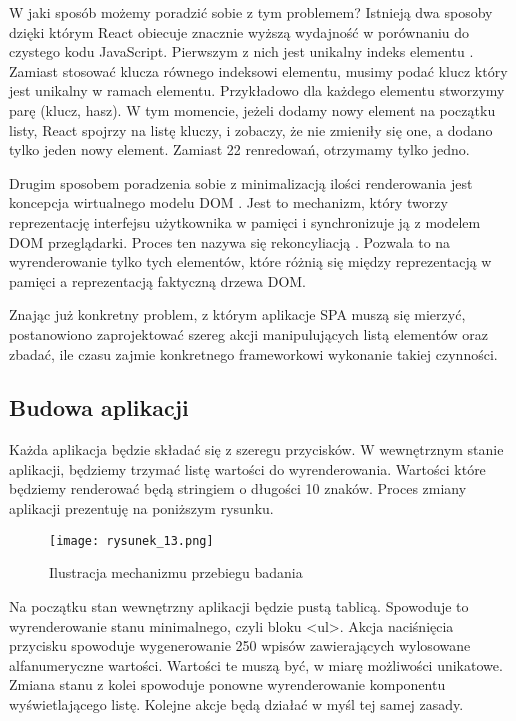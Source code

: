 W jaki sposób możemy poradzić sobie z tym problemem? Istnieją dwa sposoby dzięki którym React obiecuje znacznie wyższą wydajność w porównaniu do czystego kodu JavaScript.
Pierwszym z nich jest unikalny indeks elementu \cite{react-lists}. Zamiast stosować klucza równego indeksowi elementu, musimy podać klucz który jest unikalny w ramach elementu.
Przykładowo dla każdego elementu stworzymy parę (klucz, hasz). W tym momencie, jeżeli dodamy nowy element na początku listy, React spojrzy na listę kluczy, i zobaczy, że nie zmieniły się one, a dodano tylko jeden nowy element.
Zamiast 22 renredowań, otrzymamy tylko jedno.

Drugim sposobem poradzenia sobie z minimalizacją ilości renderowania jest koncepcja wirtualnego modelu DOM \cite{virtualdom}.
Jest to mechanizm, który tworzy reprezentację interfejsu użytkownika w pamięci i synchronizuje ją z modelem DOM przeglądarki. Proces ten nazywa się rekoncyliacją \cite{reconcilation}.
Pozwala to na wyrenderowanie tylko tych elementów, które różnią się między reprezentacją w pamięci a reprezentacją faktyczną drzewa DOM.

Znając już konkretny problem, z którym aplikacje SPA muszą się mierzyć, postanowiono zaprojektować szereg akcji manipulujących listą elementów oraz zbadać, ile czasu zajmie konkretnego frameworkowi wykonanie takiej czynności.

\subsection{Budowa aplikacji}

Każda aplikacja będzie składać się z szeregu przycisków. W wewnętrznym stanie aplikacji, będziemy trzymać listę wartości do wyrenderowania. Wartości które będziemy renderować będą stringiem o długości 10 znaków. Proces zmiany aplikacji prezentuję na poniższym rysunku.
\begin{figure}[htbp]
    \centering
    \texttt{[image: rysunek\_13.png]}
    \caption{Ilustracja mechanizmu przebiegu badania}
    \label{fig:rysunek_13}
\end{figure}

Na początku stan wewnętrzny aplikacji będzie pustą tablicą. Spowoduje to wyrenderowanie stanu minimalnego, czyli bloku <ul>.
Akcja naciśnięcia przycisku spowoduje wygenerowanie 250 wpisów zawierających wylosowane alfanumeryczne wartości. Wartości te muszą być, w miarę możliwości unikatowe.
Zmiana stanu z kolei spowoduje ponowne wyrenderowanie komponentu wyświetlającego listę. Kolejne akcje będą działać w myśl tej samej zasady.

